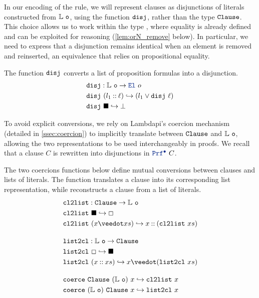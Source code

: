 In our encoding of the  rule, we will represent clauses as disjunctions of literals constructed from $\mathbb{L}~\texttt{o}$, using the function $\texttt{\upshape{disj}}$, rather than the type $\texttt{\upshape{Clause}}$.
This choice allows us to work within the type \prop, where equality is already defined and can be exploited for reasoning (\cref{lem:orN_remove} below).
In particular, we need to express that a disjunction remains identical when an element is removed and reinserted, an equivalence that relies on propositional equality.

\begin{definition}[disj]
The function $\texttt{\upshape{disj}}$ converts a list of proposition formulas into a disjunction.
\begin{align*}
&\kw{disj} : \List{o} \ra \el~o \\
&\kw{disj}~(l_1 \cons \ell) \re (l_1 \lor \kw{disj}~\ell) \\
&\kw{disj}~\nil \re \bot
\end{align*}
\end{definition}

To avoid explicit conversions, we rely on Lambdapi's coercion mechanism (detailed in \cref{ssec:coercion}) to implicitly translate between $\texttt{\upshape{Clause}}$ and $\mathbb{L}~\texttt{o}$, allowing the two representations to be used interchangeably in proofs.
We recall that a  clause $C$ is rewritten into disjunctions in $\prfcl~C$.

\begin{definition}\label{def:coerce-clause-list}
The two coercions functions below define mutual conversions between clauses and lists of literals.
The function  translates a clause into its corresponding list representation,
while  reconstructs a clause from a list of literals.
\begin{align*}
&\kw{cl2list} : \kw{Clause} \ra \List{o} \\
&\kw{cl2list}~\nil \re \Box \\
&\kw{cl2list}~(x \veedot xs) \re x \cons (\kw{cl2list}~xs) \\[1em]
&\kw{list2cl} : \List{o} \ra \kw{Clause} \\
&\kw{list2cl}~\Box \re \nil \\
&\kw{list2cl}~(x \cons xs) \re x \veedot (\kw{list2cl}~xs) \\[1em]
&\kw{coerce}~\kw{Clause}~(\List{o})~x \re \kw{cl2list}~x \\
&\kw{coerce}~(\List{o})~\kw{Clause}~x \re \kw{list2cl}~x
\end{align*}
\end{definition}

